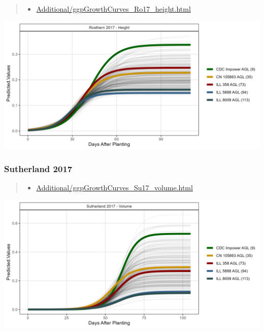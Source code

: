 \documentclass[
]{article}
\providecommand{\tightlist}{%
  \setlength{\itemsep}{0pt}\setlength{\parskip}{0pt}}
\begin{document}
\begin{quote}
\begin{itemize}
\tightlist
\item
  \href{https://derekmichaelwright.github.io/AGILE_LDP_UAV/Additional/ggpGrowthCurves_Ro17_height.html}{Additional/ggpGrowthCurves\_Ro17\_height.html}
\end{itemize}
\end{quote}

\includegraphics{Additional/ggGrowthCurves_Ro17_height.png}

\subsubsection{Sutherland 2017}\label{sutherland-2017}

\begin{quote}
\begin{itemize}
\tightlist
\item
  \href{https://derekmichaelwright.github.io/AGILE_LDP_UAV/Additional/ggpGrowthCurves_Su17_volume.html}{Additional/ggpGrowthCurves\_Su17\_volume.html}
\end{itemize}
\end{quote}

\includegraphics{Additional/ggGrowthCurves_Su17_volume.png}
\end{document}
